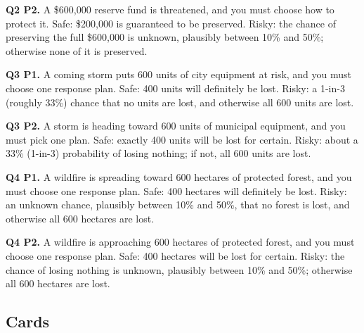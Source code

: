 \documentclass[11pt]{article}
\begin{document}
\textbf{Q2 P2.} A \$600,000 reserve fund is threatened, and you must choose how to protect it. Safe: \$200,000 is guaranteed to be preserved. Risky: the chance of preserving the full \$600,000 is unknown, plausibly between 10\% and 50\%; otherwise none of it is preserved.

\textbf{Q3 P1.} A coming storm puts 600 units of city equipment at risk, and you must choose one response plan. Safe: 400 units will definitely be lost. Risky: a 1-in-3 (roughly 33\%) chance that no units are lost, and otherwise all 600 units are lost.

\textbf{Q3 P2.} A storm is heading toward 600 units of municipal equipment, and you must pick one plan. Safe: exactly 400 units will be lost for certain. Risky: about a 33\% (1-in-3) probability of losing nothing; if not, all 600 units are lost.

\textbf{Q4 P1.} A wildfire is spreading toward 600 hectares of protected forest, and you must choose one response plan. Safe: 400 hectares will definitely be lost. Risky: an unknown chance, plausibly between 10\% and 50\%, that no forest is lost, and otherwise all 600 hectares are lost.

\textbf{Q4 P2.} A wildfire is approaching 600 hectares of protected forest, and you must choose one response plan. Safe: 400 hectares will be lost for certain. Risky: the chance of losing nothing is unknown, plausibly between 10\% and 50\%; otherwise all 600 hectares are lost.

\subsection{Cards}
\end{document}
